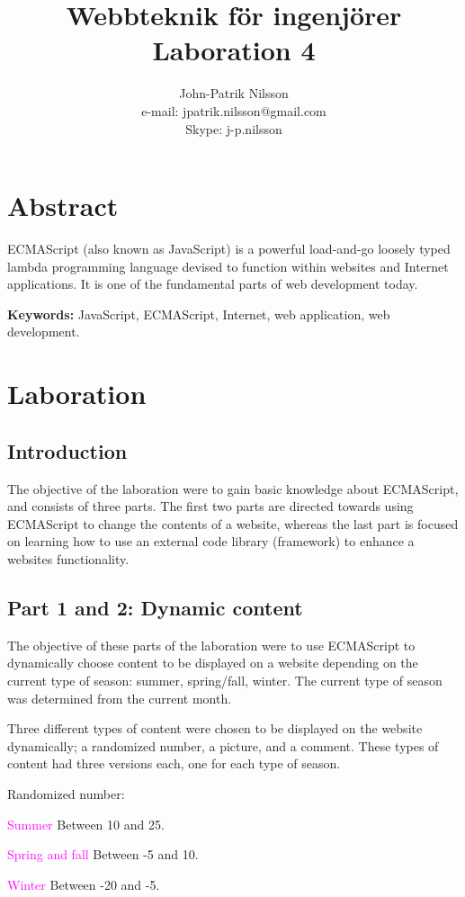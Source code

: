 \documentclass[a4paper,10pt]{article}
\title{Webbteknik för ingenjörer \\
	Laboration 4}
\author{John-Patrik Nilsson \\
	e-mail: jpatrik.nilsson@gmail.com \\
	Skype: j-p.nilsson}
\begin{document}
\maketitle

\pagestyle{empty}
\thispagestyle{empty}

\section{Abstract}
ECMAScript (also known as JavaScript) is a powerful load-and-go loosely typed lambda programming language devised to function within websites and Internet applications. It is one of the fundamental parts of web development today.

\textbf{Keywords:} JavaScript, ECMAScript, Internet, web application, web development.

\section{Laboration}
\subsection{Introduction}
The objective of the laboration were to gain basic knowledge about ECMAScript, and consists of three parts. The first two parts are directed towards using ECMAScript to change the contents of a website, whereas the last part is focused on learning how to use an external code library (framework) to enhance a websites functionality.

\subsection{Part 1 and 2: Dynamic content}
The objective of these parts of the laboration were to use ECMAScript to dynamically choose content to be displayed on a website depending on the current type of season: summer, spring/fall, winter. The current type of season was determined from the current month.

Three different types of content were chosen to be displayed on the website dynamically; a randomized number, a picture, and a comment. These types of content had three versions each, one for each type of season.

\begin{description}
	\item Randomized number:
	\begin{description}
	\item \textcolor{magenta}{Summer} Between 10 and 25.
	\item \textcolor{magenta}{Spring and fall} Between -5 and 10.
	\item \textcolor{magenta}{Winter} Between -20 and -5.
	\end{description}
\end{description}
\end{document}
